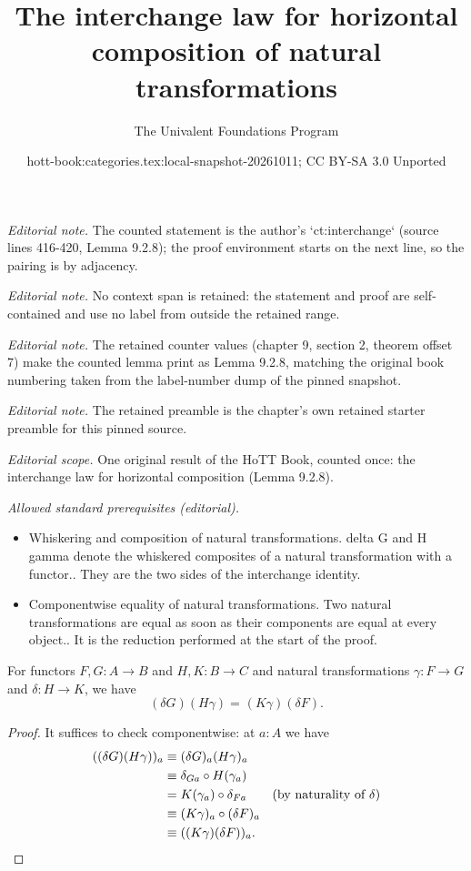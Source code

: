 \documentclass[10pt,a4paper]{article}
\title{The interchange law for horizontal composition of natural transformations}
\author{The Univalent Foundations Program}
\date{hott-book:categories.tex:local-snapshot-20261011; CC BY-SA 3.0 Unported}
\newcounter{chapter}
\providecommand{\index}[1]{}
\newcommand{\jdeq}{\equiv}      %
\newcommand{\id}[3][]{\ensuremath{#2 =_{#1} #3}\xspace}
\theoremstyle{definition}
\theoremstyle{remark}
\numberwithin{equation}{section}
\begin{document}
\maketitle
\setcounter{chapter}{9}
\setcounter{section}{2}
\setcounter{thm}{7}
\noindent\textit{Editorial note.} The counted statement is the author's `ct:interchange` (source lines 416-420, Lemma 9.2.8); the proof environment starts on the next line, so the pairing is by adjacency.\par\medskip
\noindent\textit{Editorial note.} No context span is retained: the statement and proof are self-contained and use no label from outside the retained range.\par\medskip
\noindent\textit{Editorial note.} The retained counter values (chapter 9, section 2, theorem offset 7) make the counted lemma print as Lemma 9.2.8, matching the original book numbering taken from the label-number dump of the pinned snapshot.\par\medskip
\noindent\textit{Editorial note.} The retained preamble is the chapter's own retained starter preamble for this pinned source.\par\medskip
\noindent\textit{Editorial scope.} One original result of the HoTT Book, counted once: the interchange law for horizontal composition (Lemma 9.2.8).\par\medskip
\noindent\textit{Allowed standard prerequisites (editorial).}\begin{itemize}
\item Whiskering and composition of natural transformations. delta G and H gamma denote the whiskered composites of a natural transformation with a functor.. They are the two sides of the interchange identity.
\item Componentwise equality of natural transformations. Two natural transformations are equal as soon as their components are equal at every object.. It is the reduction performed at the start of the proof.
\end{itemize}\medskip
\begin{lem}\label{ct:interchange}
  \index{interchange law}%
  For functors $F,G:A\to B$ and $H,K:B\to C$ and natural transformations $\gamma:F\to G$ and $\delta:H\to K$, we have
  \[\id{(\delta G)(H\gamma)}{(K\gamma)(\delta F)}.\]
\end{lem}

\begin{proof}
  It suffices to check componentwise: at $a:A$ we have
  \begin{align*}
    ((\delta G)(H\gamma))_a
    &\jdeq (\delta G)_{a}(H\gamma)_a\\
    &\jdeq \delta_{Ga}\circ H(\gamma_a)\\
    &= K(\gamma_a) \circ \delta_{Fa} \tag{by naturality of $\delta$}\\
    &\jdeq (K \gamma)_a\circ (\delta F)_a\\
    &\jdeq ((K \gamma)(\delta F))_a.\qedhere
  \end{align*}
\end{proof}
\end{document}
